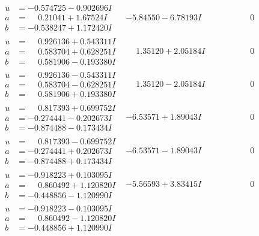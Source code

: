 \documentclass[1p]{elsarticle_modified}
\theoremstyle{definition}
\begin{document}
$$\begin{array}{c|c|c}
\begin{aligned}
u &= -0.574725 - 0.902696 I \\
a &= \phantom{-}0.21041 + 1.67524 I \\
b &= -0.538247 + 1.172420 I\end{aligned}
 & -5.84550 - 6.78193 I & \phantom{-0.000000 } 0 \\ \hline\begin{aligned}
u &= \phantom{-}0.926136 + 0.543311 I \\
a &= \phantom{-}0.583704 + 0.628251 I \\
b &= \phantom{-}0.581906 - 0.193380 I\end{aligned}
 & \phantom{-}1.35120 + 2.05184 I & \phantom{-0.000000 } 0 \\ \hline\begin{aligned}
u &= \phantom{-}0.926136 - 0.543311 I \\
a &= \phantom{-}0.583704 - 0.628251 I \\
b &= \phantom{-}0.581906 + 0.193380 I\end{aligned}
 & \phantom{-}1.35120 - 2.05184 I & \phantom{-0.000000 } 0 \\ \hline\begin{aligned}
u &= \phantom{-}0.817393 + 0.699752 I \\
a &= -0.274441 - 0.202673 I \\
b &= -0.874488 - 0.173434 I\end{aligned}
 & -6.53571 + 1.89043 I & \phantom{-0.000000 } 0 \\ \hline\begin{aligned}
u &= \phantom{-}0.817393 - 0.699752 I \\
a &= -0.274441 + 0.202673 I \\
b &= -0.874488 + 0.173434 I\end{aligned}
 & -6.53571 - 1.89043 I & \phantom{-0.000000 } 0 \\ \hline\begin{aligned}
u &= -0.918223 + 0.103095 I \\
a &= \phantom{-}0.860492 + 1.120820 I \\
b &= -0.448856 - 1.120990 I\end{aligned}
 & -5.56593 + 3.83415 I & \phantom{-0.000000 } 0 \\ \hline\begin{aligned}
u &= -0.918223 - 0.103095 I \\
a &= \phantom{-}0.860492 - 1.120820 I \\
b &= -0.448856 + 1.120990 I\end{aligned}

\end{array}$$
\end{document}
